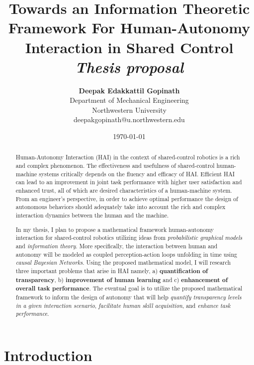 \documentclass[12pt]{article}
\title{{\bf Towards an Information Theoretic Framework For Human-Autonomy Interaction in Shared Control} \\
\it Thesis proposal}
\author{ {\bf Deepak Edakkattil Gopinath}  \\
Department of Mechanical Engineering \\
Northwestern University\\
{\small deepakgopinath@u.northwestern.edu}
}
\date{\today}
\begin{document}
\pagestyle{plain}
\maketitle

\pagebreak
\begin{abstract}
Human-Autonomy Interaction (HAI) in the context of shared-control robotics is a rich and complex phenomenon. The effectiveness and usefulness of shared-control human-machine systems critically depends on the fluency and efficacy of HAI. Efficient HAI can lead to an improvement in joint task performance with higher user satisfaction and enhanced trust, all of which are desired characteristics of a human-machine system. From an engineer's perspective, in order to achieve optimal performance the design of autonomous behaviors should adequately take into account the rich and complex interaction dynamics between the human and the machine.

In my thesis, I plan to propose a mathematical framework human-autonomy interaction for shared-control robotics utilizing ideas from \textit{probabilistic graphical models} and \textit{information theory}. More specifically, the interaction between human and autonomy will be modeled as coupled perception-action loops unfolding in time using \textit{causal Bayesian Networks}.  Using the proposed mathematical model, I will research three important problems that arise in HAI namely, a) \textbf{quantification of transparency}, b) \textbf{improvement of human learning} and c) \textbf{enhancement of overall task performance}. The eventual goal is to utilize the proposed mathematical framework to inform the design of autonomy that will help \textit{quantify transparency levels in a given interaction scenario}, \textit{facilitate human skill acquisition}, and \textit{enhance task performance}.
\end{abstract}

\pagebreak
\tableofcontents
\pagebreak

\cleardoublepage
{}

\section{Introduction}
\label{sec:intro}
\end{document}
